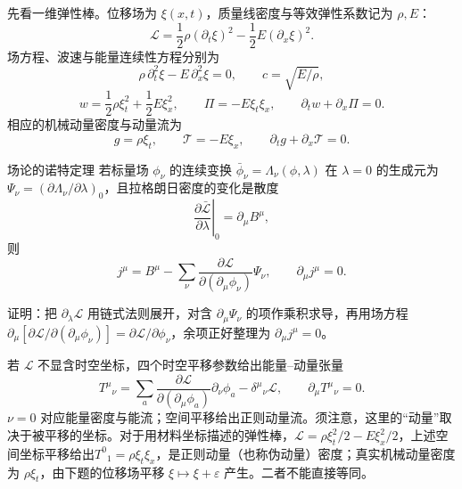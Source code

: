 先看一维弹性棒。位移场为 $\xi(x,t)$，质量线密度与等效弹性系数记为 $\rho,E$：
\[
 \mathcal L=\frac12\rho(\partial_t\xi)^2-\frac12E(\partial_x\xi)^2.
\]
场方程、波速与能量连续性方程分别为
\[
 \rho\,\partial_t^2\xi-E\,\partial_x^2\xi=0,\qquad
 c=\sqrt{E/\rho},
\]
\[
 w=\frac12\rho\xi_t^2+\frac12E\xi_x^2,\qquad
 \Pi=-E\xi_t\xi_x,\qquad
 \partial_t w+\partial_x\Pi=0.
\]
相应的机械动量密度与动量流为
\[
 g=\rho\xi_t,\qquad \mathcal T=-E\xi_x,\qquad
 \partial_tg+\partial_x\mathcal T=0.
\]

\begin{advtheorem}{场论的诺特定理}\label{advA1:thm:field-noether}
若标量场 $\phi_\nu$ 的连续变换
$\bar\phi_\nu=\Lambda_\nu(\phi,\lambda)$ 在 $\lambda=0$ 的生成元为
$\Psi_\nu=(\partial\Lambda_\nu/\partial\lambda)_0$，且拉格朗日密度的变化是散度
\[
 \left.\frac{\partial\bar{\mathcal L}}{\partial\lambda}\right|_0
 =\partial_\mu B^\mu,
\]
则
\[
 j^\mu=B^\mu-\sum_\nu
 \frac{\partial\mathcal L}{\partial(\partial_\mu\phi_\nu)}\Psi_\nu,
 \qquad \partial_\mu j^\mu=0.
\]
\end{advtheorem}
证明：把 $\partial_\lambda\mathcal L$ 用链式法则展开，对含
$\partial_\mu\Psi_\nu$ 的项作乘积求导，再用场方程
$\partial_\mu[\partial\mathcal L/\partial(\partial_\mu\phi_\nu)]
=\partial\mathcal L/\partial\phi_\nu$，余项正好整理为 $\partial_\mu j^\mu=0$。

若 $\mathcal L$ 不显含时空坐标，四个时空平移参数给出能量--动量张量
\[
 T^\mu{}_\nu=
 \sum_a\frac{\partial\mathcal L}{\partial(\partial_\mu\phi_a)}
 \partial_\nu\phi_a-\delta^\mu{}_\nu\mathcal L,
 \qquad \partial_\mu T^\mu{}_\nu=0.
\]
$\nu=0$ 对应能量密度与能流；空间平移给出正则动量流。须注意，这里的“动量”取决于被平移的坐标。对于用材料坐标描述的弹性棒，$\mathcal L=\rho\xi_t^2/2-E\xi_x^2/2$，上述空间坐标平移给出$T^0{}_1=\rho\xi_t\xi_x$，是正则动量（也称伪动量）密度；真实机械动量密度为 $\rho\xi_t$，由下题的位移场平移 $\xi\mapsto\xi+\varepsilon$ 产生。二者不能直接等同。

